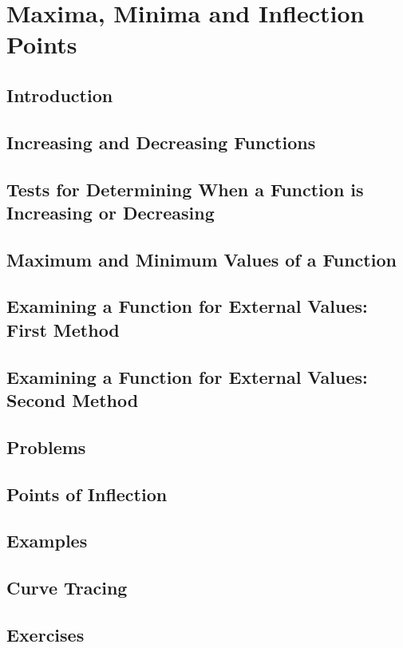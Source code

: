 \chapter{Maxima, Minima and Inflection Points}
\label{ch:08}

\section{Introduction}
\label{sec:08:01}

\section{Increasing and Decreasing Functions}
\label{sec:08:02}

\section[Determining When a Function is Increasing or Decreasing]{Tests for Determining When a Function is Increasing or Decreasing}
\label{sec:08:03}

\section{Maximum and Minimum Values of a Function}
\label{sec:08:04}

\section{Examining a Function for External Values: First Method}
\label{sec:08:05}

\section{Examining a Function for External Values: Second Method}
\label{sec:08:06}

\section{Problems}
\label{sec:08:07}

\section{Points of Inflection}
\label{sec:08:08}

\section{Examples}
\label{sec:08:09}

\section{Curve Tracing}
\label{sec:08:10}

\section{Exercises}
\label{sec:08:11}
